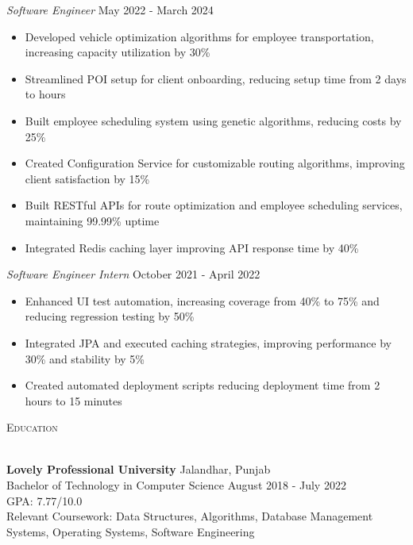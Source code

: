 \documentclass[a4paper]{article}
\newcommand{\lineunder} {
    \vspace*{-8pt} \\
    \hspace*{-18pt} \hrulefill \\
}
\newcommand{\header} [1] {
    {\hspace*{-18pt}\vspace*{6pt} \textsc{#1}}
    \vspace*{-6pt} \lineunder
}
\begin{document}
\textit{Software Engineer} \hfill May 2022 - March 2024\\
\vspace{-1mm}
\begin{itemize} \itemsep -2pt
	\item Developed vehicle optimization algorithms for employee transportation, increasing capacity utilization by 30\%
    \item Streamlined POI setup for client onboarding, reducing setup time from 2 days to hours
	\item Built employee scheduling system using genetic algorithms, reducing costs by 25\%
    \item Created Configuration Service for customizable routing algorithms, improving client satisfaction by 15\%
    \item Built RESTful APIs for route optimization and employee scheduling services, maintaining 99.99\% uptime
    \item Integrated Redis caching layer improving API response time by 40\%
\end{itemize}

\textit{Software Engineer Intern} \hfill October 2021 - April 2022\\
\vspace{-1mm}
\begin{itemize} \itemsep -2pt
	\item Enhanced UI test automation, increasing coverage from 40\% to 75\% and reducing regression testing by 50\%
	\item Integrated JPA and executed caching strategies, improving performance by 30\% and stability by 5\%
    \item Created automated deployment scripts reducing deployment time from 2 hours to 15 minutes
\end{itemize}

\header{Education}
\vspace{1mm}

\textbf{Lovely Professional University} \hfill Jalandhar, Punjab\\
Bachelor of Technology in Computer Science \hfill August 2018 - July 2022\\
GPA: 7.77/10.0\\
Relevant Coursework: Data Structures, Algorithms, Database Management Systems, Operating Systems, Software Engineering\\
\vspace{1mm}
\end{document}

